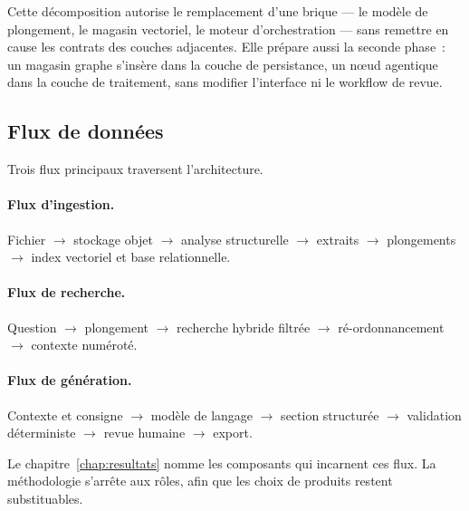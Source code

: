 Cette décomposition autorise le remplacement d'une brique --- le modèle de
plongement, le magasin vectoriel, le moteur d'orchestration --- sans
remettre en cause les contrats des couches adjacentes. Elle prépare aussi
la seconde phase~: un magasin graphe s'insère dans la couche de
persistance, un n\oe ud agentique dans la couche de traitement, sans
modifier l'interface ni le workflow de revue.

\subsection{Flux de données}

Trois flux principaux traversent l'architecture.

\paragraph{Flux d'ingestion.}
Fichier $\rightarrow$ stockage objet $\rightarrow$ analyse structurelle
$\rightarrow$ extraits $\rightarrow$ plongements $\rightarrow$ index
vectoriel et base relationnelle.

\paragraph{Flux de recherche.}
Question $\rightarrow$ plongement $\rightarrow$ recherche hybride filtrée
$\rightarrow$ ré-ordonnancement $\rightarrow$ contexte numéroté.

\paragraph{Flux de génération.}
Contexte et consigne $\rightarrow$ modèle de langage $\rightarrow$ section
structurée $\rightarrow$ validation déterministe $\rightarrow$ revue humaine
$\rightarrow$ export.

Le chapitre~\ref{chap:resultats} nomme les composants qui incarnent ces
flux. La méthodologie s'arrête aux rôles, afin que les choix de produits
restent substituables.
